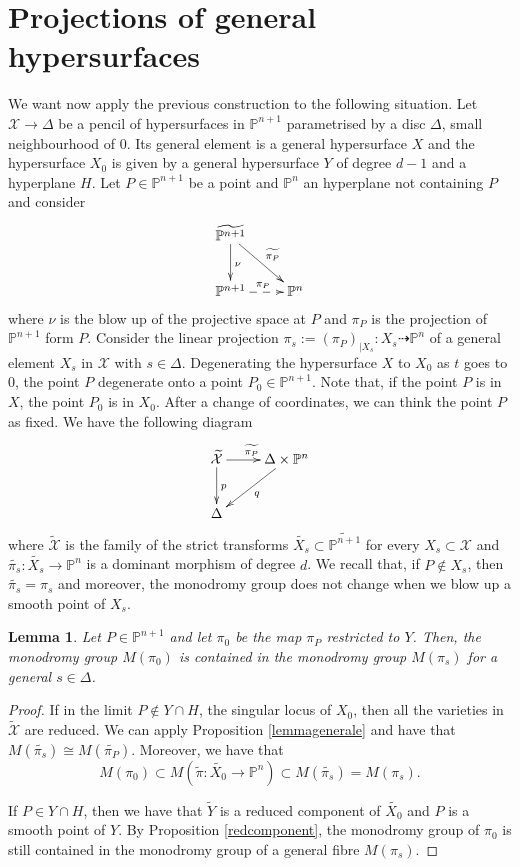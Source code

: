 \documentclass[12pt,a4paper,twoside,leqno,noamsfonts]{amsart}
\newtheorem{lem}[cor]{Lemma}
\theoremstyle{definition}
\newcommand{\bP}{\mathbb{P}}
\newcommand{\cX}{\mathcal{X}}
\begin{document}
\section{Projections of general hypersurfaces}\label{sec:main}
We want now apply the previous construction to the following situation. Let $\cX \to \Delta$ be a pencil of hypersurfaces in $\bP^{n+1}$ parametrised by a disc $\Delta$, small neighbourhood of $0$. 
Its general element is a general hypersurface $X$ and the hypersurface $X_0$ is given by a general hypersurface $Y$ of degree $d-1$ and a hyperplane $H$. 
Let $P \in \bP^{n+1}$ be a point and $\bP^n$ an hyperplane not containing $P$ and consider  
\begin{equation*}
    \xymatrix{
    \widetilde{\bP^{n+1}} \ar[d]^\nu \ar[dr]^{\widetilde{\pi_P}} & \\
    \bP^{n+1} \ar@{-->}[r]^{\pi_P} & \bP^n
    }
\end{equation*}
where $\nu$ is the blow up of the projective space at $P$ and $\pi_P$ is the projection of $\bP^{n+1}$ form $P$. 
Consider the linear projection $\pi_s:= (\pi_P)_{|X_s}: X_s \dashrightarrow \bP^n$ of a general element $X_s$ in $\cX$ with $s \in \Delta$. 
Degenerating the hypersurface $X$ to $X_0$ as $t$ goes to $0$, the point $P$ degenerate onto a point $P_0 \in \bP^{n+1}$. Note that, if the point $P$ is in $X$, the point $P_0$ is in $X_0$. After a change of coordinates, we can think the point $P$ as fixed. We have the following diagram
\begin{equation*}
    \xymatrix{
    \widetilde{\cX} \ar[r]^{\widetilde{\pi_P}} \ar[d]^p & \Delta \times \bP^n \ar[dl]^q \\
    \Delta & }
\end{equation*}
where $\widetilde{\cX}$ is the family of the strict transforms $\widetilde{X_s} \subset \widetilde{\bP^{n+1}}$ for every $X_s \subset \cX$ and $\widetilde{\pi_s}: \widetilde{X_s} \to \bP^n $ is a dominant morphism of degree $d$. We recall that, if $P \notin X_s$, then $\widetilde{\pi_s}=\pi_s$ and moreover, the monodromy group does not change when we blow up a smooth point of $X_s$. 

\begin{lem}\label{induction}
Let $P \in \bP^{n+1}$ and let $\pi_0$ be the map $\pi_P$ restricted to $Y$. Then, the monodromy group $M(\pi_0)$ is contained in the monodromy group $M(\pi_s)$ for a general $s \in \Delta$.
\end{lem}
\begin{proof}
If in the limit $P \notin Y \cap H$, the singular locus of $X_0$, then all the varieties in $\widetilde{\cX}$ are reduced. We can apply Proposition \ref{lemmagenerale} and have that $M(\widetilde{\pi_s}) \cong M(\widetilde{\pi_P})$. Moreover, we have that $$M(\pi_0) \subset M(\widetilde{\pi}:\widetilde{X_0} \to \bP^n) \subset  M(\widetilde{\pi_s})=M(\pi_s).$$ 


If $P \in Y \cap H$, then we have that $\widetilde{Y}$ is a reduced component of $\widetilde{X_0}$ and $P$ is a smooth point of $Y$. By Proposition \ref{redcomponent}, the monodromy group of $\pi_0$ is still contained in the monodromy group of a general fibre $M(\pi_s)$.
\end{proof}
\end{document}

